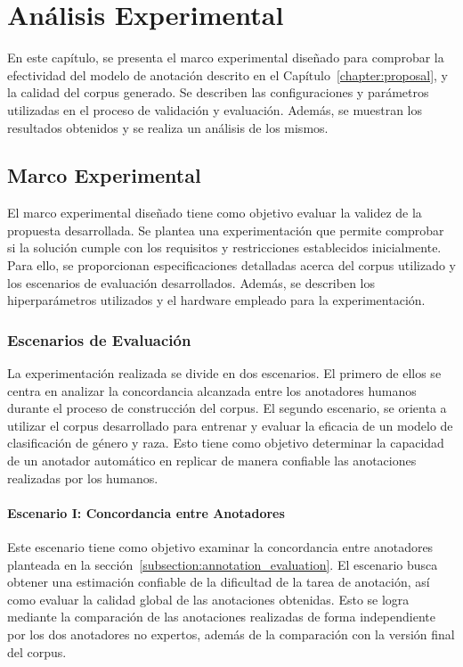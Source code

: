 \chapter{An\'alisis Experimental}\label{chapter:implementation}
En este cap\'itulo, se presenta el marco experimental dise\~nado para comprobar la efectividad del modelo de anotaci\'on 
descrito en el Cap\'itulo~\ref{chapter:proposal}, y la calidad del corpus generado. Se describen las configuraciones y 
par\'ametros utilizadas en el proceso de validaci\'on y evaluaci\'on. Adem\'as, se muestran los resultados obtenidos y 
se realiza un an\'alisis de los mismos.

\section{Marco Experimental}\label{section:experimental_framework}
El marco experimental dise\~nado tiene como objetivo evaluar la validez de la propuesta desarrollada. Se plantea 
una experimentaci\'on que permite comprobar si la soluci\'on cumple con los requisitos y restricciones establecidos inicialmente.
Para ello, se proporcionan especificaciones detalladas acerca del corpus utilizado y los escenarios de evaluaci\'on desarrollados.
Adem\'as, se describen los hiperpar\'ametros utilizados y el hardware empleado para la experimentaci\'on.

\subsection{Escenarios de Evaluaci\'on}
La experimentaci\'on realizada se divide en dos escenarios. El primero de ellos se centra en analizar la concordancia alcanzada entre 
los anotadores humanos durante el proceso de construcci\'on del corpus. El segundo escenario, se orienta a utilizar el corpus 
desarrollado para entrenar y evaluar la eficacia de un modelo de clasificaci\'on de g\'enero y raza. Esto tiene como objetivo determinar
la capacidad de un anotador autom\'atico en replicar de manera confiable las anotaciones realizadas por los humanos. 

\subsubsection{Escenario I: Concordancia entre Anotadores}
Este escenario tiene como objetivo examinar la concordancia entre anotadores planteada en la 
secci\'on~\ref{subsection:annotation_evaluation}. El escenario busca obtener una estimaci\'on confiable de la dificultad de la 
tarea de anotaci\'on, as\'i como evaluar la calidad global de las anotaciones obtenidas. Esto se logra mediante la comparaci\'on
de las anotaciones realizadas de forma independiente por los dos anotadores no expertos, adem\'as de la comparaci\'on con la 
versi\'on final del corpus.

